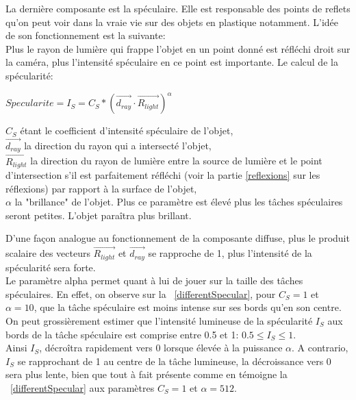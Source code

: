 \documentclass[11pt]{article}
\begin{document}
La dernière composante est la spéculaire. Elle est responsable des points de reflets qu'on peut voir dans la vraie vie sur des objets en plastique notamment. L'idée de son fonctionnement est la suivante:\\
Plus le rayon de lumière qui frappe l'objet en un point donné est réfléchi droit sur la caméra, plus l'intensité spéculaire en ce point est importante. Le calcul de la spécularité:

\begin{center}
	$Specularite = I_S = C_S*(\overrightarrow{d_{ray}}\cdot\overrightarrow{R_{light}})^\alpha$
\end{center}
$C_S$ étant le coefficient d'intensité spéculaire de l'objet,\\
$\overrightarrow{d_{ray}}$ la direction du rayon qui a intersecté l'objet,\\
$\overrightarrow{R_{light}}$ la direction du rayon de lumière entre la source de lumière et le point d'intersection s'il est parfaitement réfléchi (voir la partie \ref{reflexions} sur les réflexions) par rapport à la surface de l'objet,\\
$\alpha$ la "brillance" de l'objet. Plus ce paramètre est élevé plus les tâches spéculaires seront petites. L'objet paraîtra plus brillant.

D'une façon analogue au fonctionnement de la composante diffuse, plus le produit scalaire des vecteurs $\overrightarrow{R_{light}}$ et $\overrightarrow{d_{ray}}$ se rapproche de 1, plus l'intensité de la spécularité sera forte.\\
Le paramètre alpha permet quant à lui de jouer sur la taille des tâches spéculaires. En effet, on observe sur la \figurename~\ref{differentSpecular}, pour $C_S = 1$ et $\alpha = 10$, que la tâche spéculaire est moins intense sur ses bords qu'en son centre.\\
On peut grossièrement estimer que l'intensité lumineuse de la spécularité $I_S$ aux bords de la tâche spéculaire est comprise entre 0.5 et 1: $0.5 \leqslant I_S \leqslant 1$.\\
Ainsi $I_S$, décroîtra rapidement vers 0 lorsque élevée à la puissance $\alpha$. A contrario, $I_S$ se rapprochant de 1 au centre de la tâche lumineuse, la décroissance vers 0 sera plus lente, bien que tout à fait présente comme en témoigne la \figurename~\ref{differentSpecular} aux paramètres $C_S = 1$ et $\alpha = 512$.
\end{document}
